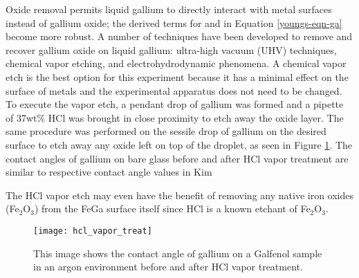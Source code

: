 Oxide removal permits liquid gallium to directly interact with metal surfaces instead of gallium oxide; the derived terms for \gamSL and \gamLV in Equation \ref{youngs-eqn-ga} become more robust. A number of techniques have been developed to remove and recover gallium oxide on liquid gallium: ultra-high vacuum (UHV) techniques,\cite{Regan1995,Regan1997} chemical vapor etching,\cite{Kim2013,Doudrick2014} and electrohydrodynamic phenomena.\cite{Khan2014} A chemical vapor etch is the best option for this experiment because it has a minimal effect on the surface of metals and the experimental apparatus does not need to be changed.  
To execute the vapor etch, a pendant drop of gallium was formed and a pipette of 37wt\% HCl was brought in close proximity to etch away the oxide layer. The same procedure was performed on the sessile drop of gallium on the desired surface to etch away any oxide left on top of the droplet, as seen in Figure \ref{fig:hcl_vapor_treat}. The contact angles of gallium on bare glass before and after HCl vapor treatment are similar to respective contact angle values in Kim \etal\cite{Kim2013}

The HCl vapor etch may even have the benefit of removing any native iron oxides (Fe$_2$O$_3$) from the FeGa surface itself since HCl is a known etchant of Fe$_2$O$_3$.\cite{Walker1991}



\begin{figure}
	\centering
	\texttt{[image: hcl\_vapor\_treat]}
	\caption{This image shows the contact angle of gallium on a Galfenol sample in an argon environment before and after HCl vapor treatment.}
	\label{fig:hcl_vapor_treat}
\end{figure}





